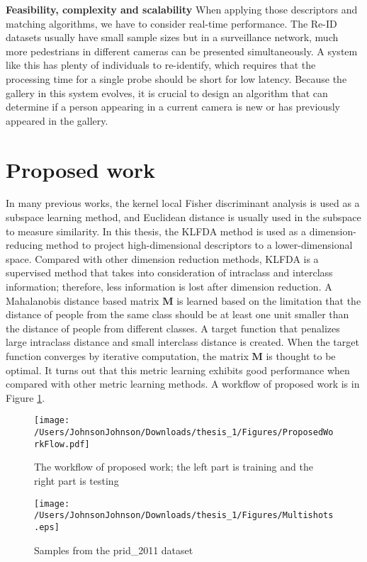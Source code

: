 \textbf{Feasibility, complexity and scalability} When applying those descriptors and matching algorithms, we have to consider real-time performance. The Re-ID datasets usually have small sample sizes but in a surveillance network, much more pedestrians in different cameras can be presented simultaneously. A system like this has plenty of individuals to re-identify, which requires that the processing time for a single probe should be short for low latency. Because the gallery in this system evolves, it is crucial to design an algorithm that can determine if a person appearing in a current camera is new or has previously appeared in the gallery.

\section{Proposed work}
In many previous works, the kernel local Fisher discriminant analysis is used as a subspace learning method, and Euclidean distance is usually used in the subspace to measure similarity. In this thesis, the KLFDA \cite{KLFDA} method is used as a dimension-reducing method to project high-dimensional descriptors to a lower-dimensional space. Compared with other dimension reduction methods, KLFDA is a supervised method that takes into consideration of intraclass and interclass information; therefore, less information is lost after dimension reduction. A Mahalanobis distance based matrix $\bm{M}$ is learned based on the limitation that the distance of people from the same class should be at least one unit smaller than the distance of people from different classes. A target function that penalizes large intraclass distance and small interclass distance is created. When the target function converges by iterative computation, the matrix $\bm{M}$ is thought to be optimal. It turns out that this metric learning exhibits good performance when compared with other metric learning methods. A workflow of proposed work is in Figure \ref{ProposedWorkflow}.

\begin{figure}[H]

\texttt{[image: /Users/JohnsonJohnson/Downloads/thesis\_1/Figures/ProposedWorkFlow.pdf]}
\vspace{-2em}
\caption{The workflow of proposed work; the left part is training and the right part is testing}
\label{ProposedWorkflow}

\end{figure}
\begin{figure}[H]

\texttt{[image: /Users/JohnsonJohnson/Downloads/thesis\_1/Figures/Multishots.eps]}
\vspace{-2em}
\caption{Samples from the prid\_2011 dataset}

\end{figure}


